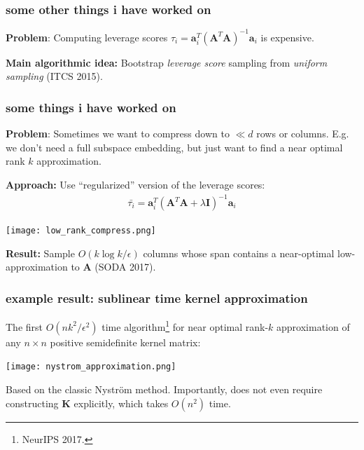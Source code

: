 \documentclass[compress]{beamer}
\newcommand{\bv}[1]{\mathbf{#1}}
\begin{document}
\begin{frame}[t]
	\frametitle{some other things i have worked on}
	\textbf{Problem}: Computing leverage scores $\tau_i = \bv{a}_i^T(\bv{A}^T\bv{A})^{-1}\bv{a}_i$ is expensive. 	\vspace{-.5em}

		
		\begin{center}
			
		\end{center}
		
	\vspace{-.5em}
			\textbf{Main algorithmic idea:} Bootstrap \emph{leverage score} sampling from \emph{uniform sampling} (ITCS 2015).
\end{frame}

\begin{frame}[t]
	\frametitle{some things i have worked on}
	\textbf{Problem}: Sometimes we want to compress down to $\ll d$ rows or columns. E.g. we don't need a full subspace embedding, but just want to find a near optimal rank $k$ approximation. 
	
	\textbf{Approach:} Use ``regularized'' version of the leverage scores:
	\begin{align*}
		\bar{\tau_i} = \bv{a}_i^T(\bv{A}^T\bv{A} + \lambda \bv{I})^{-1}\bv{a}_i
	\end{align*} 
	\begin{center}
		\texttt{[image: low\_rank\_compress.png]}
	\end{center}
	\textbf{Result:} Sample $O(k\log k /\epsilon)$ columns whose span contains a near-optimal low-approximation to $\bv{A}$ (SODA 2017).
	
\end{frame}

\begin{frame}
	\frametitle{example result: sublinear time kernel approximation}
	The first $O(nk^2/\epsilon^2)$ time algorithm\footnote{NeurIPS 2017.} for near optimal rank-$k$ approximation of any $n\times n$ positive semidefinite kernel matrix:
	\begin{center}
		\texttt{[image: nystrom\_approximation.png]}
		
		Based on the classic Nystr\"{o}m method. Importantly, does not even require constructing $\bv{K}$ explicitly, which takes $O(n^2)$ time.
	\end{center}
\end{frame}
\end{document}
